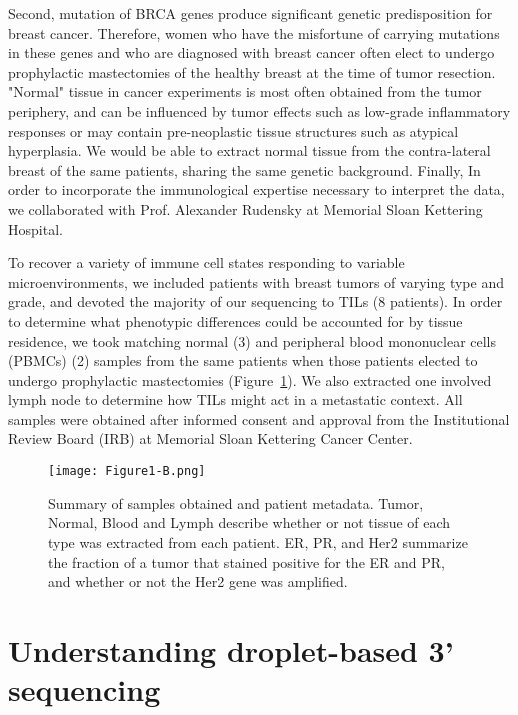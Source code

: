Second, mutation of BRCA genes produce significant genetic predisposition for breast cancer.
Therefore, women who have the misfortune of carrying mutations in these genes and who are diagnosed with breast cancer often elect to undergo prophylactic mastectomies of the healthy breast at the time of tumor resection. 
"Normal" tissue in cancer experiments is most often obtained from the tumor periphery, and can be influenced by tumor effects such as low-grade inflammatory responses or may contain pre-neoplastic tissue structures such as atypical hyperplasia. 
We would be able to extract normal tissue from the contra-lateral breast of the same patients, sharing the same genetic background. 
Finally, In order to incorporate the immunological expertise necessary to interpret the data, we collaborated with Prof. Alexander Rudensky at Memorial Sloan Kettering Hospital.

To recover a variety of immune cell states responding to variable microenvironments, we included patients with breast tumors of varying type and grade, and devoted the majority of our sequencing to TILs (8 patients). 
In order to determine what phenotypic differences could be accounted for by tissue residence, we took matching normal (3) and peripheral blood mononuclear cells (PBMCs) (2) samples from the same patients when those patients elected to undergo prophylactic mastectomies (Figure~\ref{fig:1b}). 
We also extracted one involved lymph node to determine how TILs might act in a metastatic context.  All samples were obtained after informed consent and approval from the Institutional Review Board (IRB) at Memorial Sloan Kettering Cancer Center.

\begin{figure}
\centering
\texttt{[image: Figure1-B.png]}
\caption{Summary of samples obtained and patient metadata. Tumor, Normal, Blood and Lymph describe whether or not tissue of each type was extracted from each patient. ER, PR, and Her2 summarize the fraction of a tumor that stained positive for the ER and PR, and whether or not the Her2 gene was amplified.} 
\label{fig:1b}
\end{figure} 

\section{Understanding droplet-based 3' sequencing}

